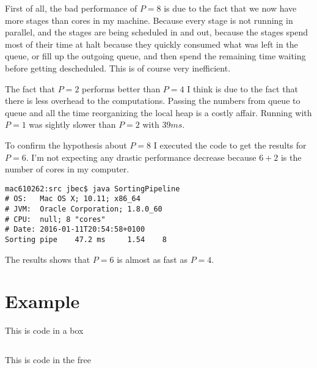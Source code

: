 \documentclass{ituhandin}
\begin{document}
First of all, the bad performance of $P = 8$ is due to the fact that we now have more stages than cores in my machine. Because every stage is not running in parallel, and the stages are being scheduled in and out, because the stages spend most of their time at halt because they quickly consumed what was left in the queue, or fill up the outgoing queue, and then spend the remaining time waiting before getting descheduled. This is of course very inefficient. 

The fact that $P = 2$ performs better than $P = 4$ I think is due to the fact that there is less overhead to the computations. Passing the numbers from queue to queue and all the time reorganizing the local heap is a costly affair. Running with $P = 1$ was sightly slower than $P = 2$ with $39ms$.

To confirm the hypothesis about $P = 8$ I executed the code to get the results for $P = 6$. I'm not expecting any drastic performance decrease because $6+2$ is the number of cores in my computer. 

\begin{lstlisting}[language={},frame={}]
mac610262:src jbec$ java SortingPipeline
# OS:   Mac OS X; 10.11; x86_64
# JVM:  Oracle Corporation; 1.8.0_60
# CPU:  null; 8 "cores"
# Date: 2016-01-11T20:54:58+0100
Sorting pipe    47.2 ms     1.54    8
\end{lstlisting}

The results shows that $P = 6$ is almost as fast as $P = 4$.

\chapter{} %
\chapter{} %
\chapter{} %
\chapter{} %

\chapter*{Example}

This is code in a box

\begin{lstlisting}[caption=This is a caption]
\end{lstlisting}


This is code in the free

\begin{lstlisting}[frame={}]
\end{lstlisting}




\label{LastPage}
\end{document}
